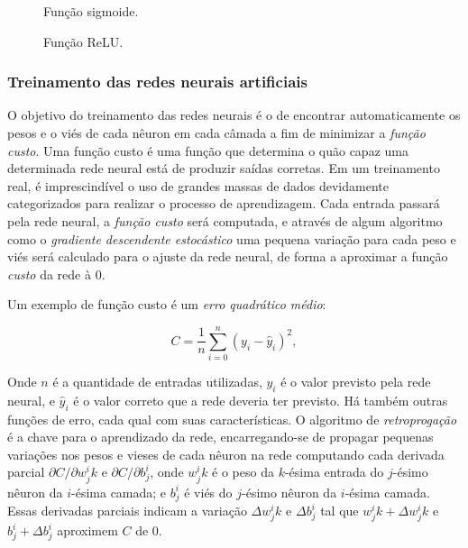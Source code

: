 \documentclass[12pt, a4paper]{article}
\begin{document}
\begin{figure}[H]
	\centering
	\caption{Função sigmoide.}
\end{figure}

\begin{figure}[H]
	\centering
	\caption{Função ReLU.}
\end{figure}

\subsubsection{Treinamento das redes neurais artificiais}
O objetivo do treinamento das redes neurais é o de encontrar automaticamente os pesos e o viés de cada nêuron em cada câmada a fim de minimizar a \emph{função custo}. Uma função custo é uma função que determina o quão capaz uma determinada rede neural está de produzir saídas corretas. Em um treinamento real, é imprescindível o uso de grandes massas de dados devidamente categorizados para realizar o processo de aprendizagem. Cada entrada passará pela rede neural, a \emph{função custo} será computada, e através de algum algoritmo como o \emph{gradiente descendente estocástico} uma pequena variação para cada peso e viés será calculado para o ajuste da rede neural, de forma a aproximar a função \emph{custo} da rede à $0$.

Um exemplo de função custo é um \emph{erro quadrático médio}:

\begin{equation}
C = \frac{1}{n} \displaystyle\sum_{i=0}^{n} (y_i - \hat{y}_i)^2,
\end{equation}

Onde $n$ é a quantidade de entradas utilizadas, $y_i$ é o valor previsto pela rede neural, e $\hat{y}_i$ é o valor correto que a rede deveria ter previsto. Há também outras funções de erro, cada qual com suas características. O algoritmo de \emph{retroprogação} é a chave para o aprendizado da rede, encarregando-se de propagar pequenas variações nos pesos e vieses de cada nêuron na rede computando cada derivada parcial 
$\partial C/\partial w_{j}^{i} k$ e $\partial C/\partial b_{j}^{i}$, onde $w_{j}^{i} k$ é o peso da $k$-ésima entrada do $j$-ésimo nêuron da $i$-ésima camada; e $b_{j}^{i}$ é viés do $j$-ésimo nêuron da $i$-ésima camada. Essas derivadas parciais indicam a variação $\Delta w_{j}^{i} k$ e $\Delta b_{j}^{i}$ tal que 
$w_{j}^{i} k + \Delta w_{j}^{i} k$ e $b_{j}^{i} + \Delta b_{j}^{i}$ aproximem $C$ de 0.
\end{document}
